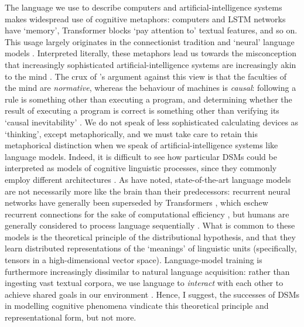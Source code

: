 The language we use to describe computers and artificial-intelligence systems makes
widespread use of cognitive metaphors: computers and LSTM networks have `memory',
Transformer blocks `pay attention to' textual features, and so on.
This usage largely originates in the connectionist tradition and `neural' language
models .
Interpreted literally, these metaphors lead us towards the misconception that
increasingly sophisticated artificial-intelligence systems are increasingly akin to the
mind \parencites[103]{Hacker2019}.
The crux of \citeauthor{Hacker2019}'s argument against this view is that the faculties
of the mind are \emph{normative}, whereas the behaviour of machines is \emph{causal}:
following a rule is something other than executing a program, and determining whether
the result of executing a program is correct is something other than verifying its
`causal inevitability' \parencites*[107-108]{Hacker2019}.
We do not speak of less sophisticated calculating devices as `thinking', except
metaphorically, and we must take care to retain this metaphorical distinction when we
speak of artificial-intelligence systems like language models.
Indeed, it is difficult to see how particular DSMs could be interpreted as models of
cognitive linguistic processes, since they commonly employ different architectures
\parencites[570]{Gastaldi2021}.
As \textcites{Houghton2023} have noted, state-of-the-art language models are not
necessarily more like the brain than their predecessors: recurrent neural networks have
generally been superseded by Transformers \parencites{Wang2019b}{Gillioz2020}, which
eschew recurrent connections for the sake of computational efficiency
, but humans are generally considered to process
language sequentially \parencites{Dominey2003}.
What is common to these models is the theoretical principle of the distributional
hypothesis, and that they learn distributed representations of the `meanings' of
linguistic units (specifically, tensors in a high-dimensional vector space).
Language-model training is furthermore increasingly dissimilar to natural language
acquisition: rather than ingesting vast textual corpora, we use language to
\emph{interact} with each other to achieve shared goals in our environment
\parencites[361-363]{Lenci2023}.
Hence, I suggest, the successes of DSMs in modelling cognitive phenomena vindicate this
theoretical principle and representational form, but not more.


